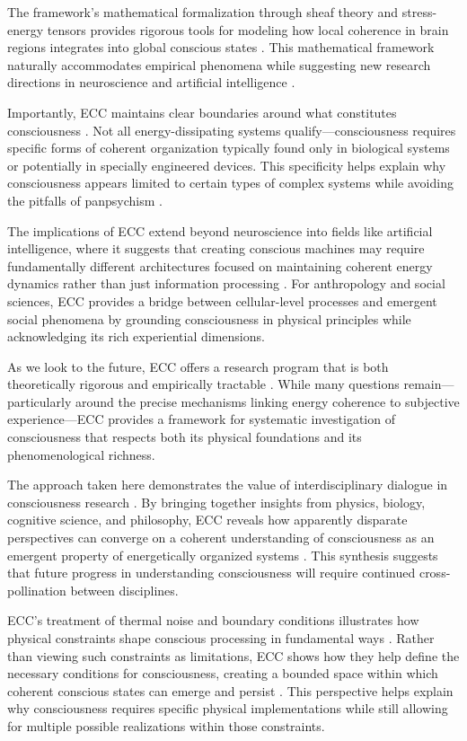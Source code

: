 \begin{refsection}
The framework's mathematical formalization through sheaf theory and stress-energy tensors provides rigorous tools for modeling how local coherence in brain regions integrates into global conscious states \cite{varela2016embodied}. This mathematical framework naturally accommodates empirical phenomena while suggesting new research directions in neuroscience and artificial intelligence \cite{feinberg2016ancient}.

Importantly, ECC maintains clear boundaries around what constitutes consciousness \cite{churchland2013touching}. Not all energy-dissipating systems qualify—consciousness requires specific forms of coherent organization typically found only in biological systems or potentially in specially engineered devices. This specificity helps explain why consciousness appears limited to certain types of complex systems while avoiding the pitfalls of panpsychism \cite{goff2019galileo}.

The implications of ECC extend beyond neuroscience into fields like artificial intelligence, where it suggests that creating conscious machines may require fundamentally different architectures focused on maintaining coherent energy dynamics rather than just information processing \cite{chalmers2010character}. For anthropology and social sciences, ECC provides a bridge between cellular-level processes and emergent social phenomena by grounding consciousness in physical principles while acknowledging its rich experiential dimensions.

As we look to the future, ECC offers a research program that is both theoretically rigorous and empirically tractable \cite{seth2021being}. While many questions remain—particularly around the precise mechanisms linking energy coherence to subjective experience—ECC provides a framework for systematic investigation of consciousness that respects both its physical foundations and its phenomenological richness.

The approach taken here demonstrates the value of interdisciplinary dialogue in consciousness research \cite{deacon2011incomplete}. By bringing together insights from physics, biology, cognitive science, and philosophy, ECC reveals how apparently disparate perspectives can converge on a coherent understanding of consciousness as an emergent property of energetically organized systems \cite{koch2019feeling}. This synthesis suggests that future progress in understanding consciousness will require continued cross-pollination between disciplines.

ECC's treatment of thermal noise and boundary conditions illustrates how physical constraints shape conscious processing in fundamental ways \cite{rovelli2018order}. Rather than viewing such constraints as limitations, ECC shows how they help define the necessary conditions for consciousness, creating a bounded space within which coherent conscious states can emerge and persist \cite{penrose2016fashion}. This perspective helps explain why consciousness requires specific physical implementations while still allowing for multiple possible realizations within those constraints.


\end{refsection}
